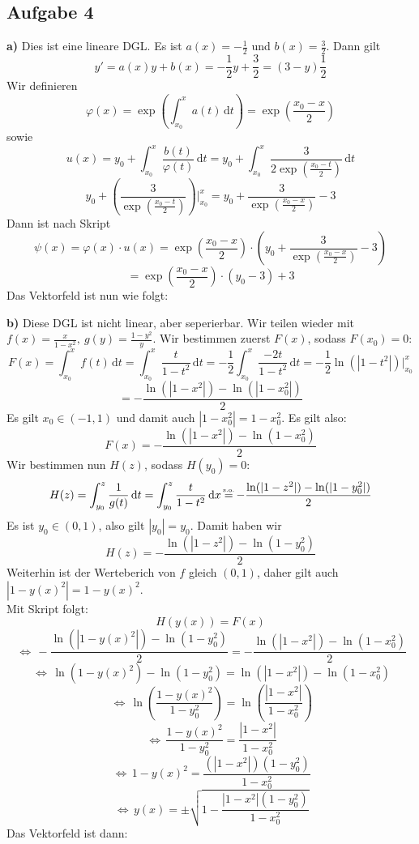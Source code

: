 \documentclass[a4paper,graphics,11pt]{article}
\newcommand{\aufgabe}[1]{\subsection*{Aufgabe #1}}
\newcommand{\up}[2]{\mathrel{\overset{\makebox[0pt]{\mbox{\normalfont\tiny #2}}}{#1}}}
\begin{document}
\newpage
\aufgabe{4}
\textbf{a)}
Dies ist eine lineare DGL. Es ist $a(x) = -\frac{1}{2}$ und $b(x) = \frac{3}{2}$. Dann gilt
$$
	y' = a(x)y+b(x) = -\frac{1}{2}y+\frac{3}{2} = (3-y)\frac{1}{2}
$$
Wir definieren
$$
	\varphi(x) = \exp\left(\int_{x_0}^{x} a(t)\, \mathrm{d}t\right) = \exp\left(\frac{x_0-x}{2}\right)
$$
sowie
$$
	u(x) = y_0 + \int_{x_0}^{x} \frac{b(t)}{\varphi(t)}\, \mathrm{d}t
	= y_0 + \int_{x_0}^{x} \frac{3}{2\exp\left(\frac{x_0-t}{2}\right)}\, \mathrm{d}t
$$$$
	y_0 + \left(\frac{3}{\exp(\frac{x_0-t}{2})}\right)\bigg|_{x_0}^x
	= y_0 + \frac{3}{\exp(\frac{x_0-x}{2})} -3
$$
Dann ist nach Skript
$$
	\psi(x) = \varphi(x)\cdot u(x)
	= \exp\left(\frac{x_0-x}{2}\right) \cdot\left(y_0 + \frac{3}{\exp(\frac{x_0-x}{2})} -3\right)
$$$$
	= \exp\left(\frac{x_0-x}{2}\right) \cdot\left(y_0-3\right)+3
$$
Das Vektorfeld ist nun wie folgt:

\newpage
\textbf{b)}
Diese DGL ist nicht linear, aber seperierbar.
Wir teilen wieder mit $f(x) = \frac{x}{1-x^2},\ g(y) = \frac{1-y^2}{y}$.
Wir bestimmen zuerst $F(x)$, sodass $F(x_0) = 0$:
$$
	F(x) =
	\int_{x_0}^{x} f(t)\, \mathrm{d}t
	= \int_{x_0}^{x} \frac{t}{1-t^2}\, \mathrm{d}t
	= -\frac{1}{2}\int_{x_0}^{x} \frac{-2t}{1-t^2}\, \mathrm{d}t
	= -\frac{1}{2}\ln(|1-t^2|)\big|_{x_0}^x
$$$$
	= -\frac{\ln(|1-x^2|)-\ln(|1-x_0^2|)}{2}
$$
Es gilt $x_0 \in (-1,1)$ und damit auch $|1-x_0^2| = 1-x_0^2$. Es gilt also:
$$
	F(x) = -\frac{\ln(|1-x^2|)-\ln(1-x_0^2)}{2}
$$
Wir bestimmen nun $H(z)$, sodass
$H(y_0) = 0$:
$$
	H(z) = \int_{y_0}^{z} \frac{1}{g(t)}\, \mathrm{d}t
	= \int_{y_0}^{z} \frac{t}{1-t^2}\, \mathrm{d}x \up{=}{s.o.} -\frac{\ln(|1-z^2|)-\ln(|1-y_0^2|)}{2}
$$
Es ist $y_0 \in (0,1)$, also gilt $|y_0| = y_0$. Damit haben wir
$$
	H(z) = -\frac{\ln(|1-z^2|)-\ln(1-y_0^2)}{2}
$$
Weiterhin ist der Werteberich von $f$ gleich $(0,1)$, daher gilt auch $|1-y(x)^2| = 1-y(x)^2$.\\
Mit Skript folgt:
$$
	H(y(x)) = F(x)
$$$$
	\,\Longleftrightarrow\, -\frac{\ln(|1-y(x)^2|) -\ln(1-y_0^2)}{2} = -\frac{\ln(|1-x^2|)-\ln(1-x_0^2)}{2}
$$$$
	\,\Longleftrightarrow\, \ln(1-y(x)^2) -\ln(1-y_0^2) = \ln(|1-x^2|)-\ln(1-x_0^2)
$$$$
	\,\Longleftrightarrow\, \ln\left(\frac{1-y(x)^2}{1-y_0^2}\right) = \ln\left(\frac{|1-x^2|}{1-x_0^2}\right)
$$$$
	\,\Longleftrightarrow\, \frac{1-y(x)^2}{1-y_0^2} = \frac{|1-x^2|}{1-x_0^2}
$$$$
	\,\Longleftrightarrow\, 1-y(x)^2 = \frac{(|1-x^2|)(1-y_0^2)}{1-x_0^2}
$$$$
	\,\Longleftrightarrow\, y(x) = \pm\sqrt{1-\frac{|1-x^2|(1-y_0^2)}{1-x_0^2}}
$$
Das Vektorfeld ist dann:
\end{document}
